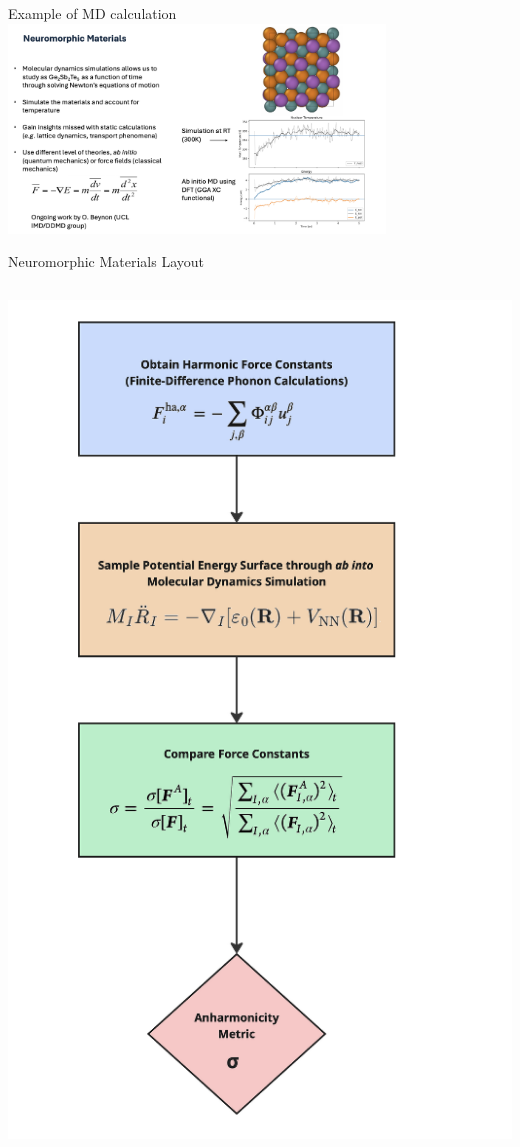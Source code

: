 \documentclass[aspectratio=169]{beamer}
\begin{document}
\begin{frame}{Example of MD calculation}
  \centering
  \includegraphics[width=0.75\textwidth]{media/gst_md.png}
\end{frame}




\begin{frame}{Neuromorphic Materials Layout}
  \begin{columns}[T] %

    \begin{column}{0.33\textwidth}
      \centering
      \includegraphics[height=0.7\textheight]{media/anharmonic_pipeline.png}
    \end{column}


\end{columns}
\end{frame}
\end{document}
